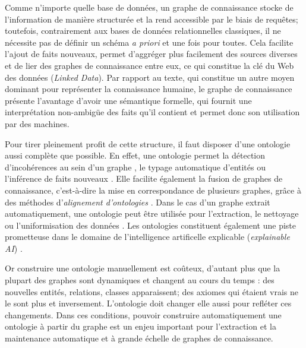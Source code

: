 Comme n'importe quelle base de données, un graphe de connaissance stocke de l'information de manière structurée et la rend accessible par le biais de requêtes; toutefois, contrairement aux bases de données relationnelles classiques, il ne nécessite pas de définir un schéma \textit{a priori} et une fois pour toutes. Cela facilite l'ajout de faits nouveaux, permet d'aggréger plus facilement des sources diverses et de lier des graphes de connaissance entre eux, ce qui constitue la clé du Web des données (\textit{Linked Data}).
Par rapport au texte, qui constitue un autre moyen dominant pour représenter la connaissance humaine, le graphe de connaissance présente l'avantage d'avoir une sémantique formelle, qui fournit une interprétation non-ambigüe des faits qu'il contient et permet donc son utilisation par des machines.

Pour tirer pleinement profit de cette structure, il faut disposer d'une ontologie aussi complète que possible. %
%
En effet, une ontologie permet la détection d'incohérences au sein d'un graphe \cite{inconsistencies2012dbpedia}, le typage automatique d'entités \cite{typing2017kejriwal} ou l'inférence de faits nouveaux \cite{inference2015dinto}. Elle facilite également la fusion de graphes de connaissance, c'est-à-dire la mise en correspondance de plusieurs graphes, grâce à des méthodes d'\textit{alignement d'ontologies} \cite{otero2015ontology}. Dans le cas d'un graphe extrait automatiquement, une ontologie peut être utilisée pour l'extraction, le nettoyage ou l'uniformisation des données \cite{webmining2011bhatia, webmining2014li}. Les ontologies constituent également une piste prometteuse dans le domaine de l'intelligence artificelle explicable (\textit{explainable AI}) \cite{explainable2018holzinger, explainable2019cardillo, explainable2019semantic}.

Or construire une ontologie manuellement est coûteux, d'autant plus que la plupart des graphes sont dynamiques et changent au cours du temps : des nouvelles entités, relations, classes apparaissent; des axiomes qui étaient vrais ne le sont plus et inversement. L'ontologie doit changer elle aussi pour refléter ces changements. Dans ces conditions, pouvoir construire automatiquement une ontologie à partir du graphe est un enjeu important pour l'extraction et la maintenance automatique et à grande échelle de graphes de connaissance.

